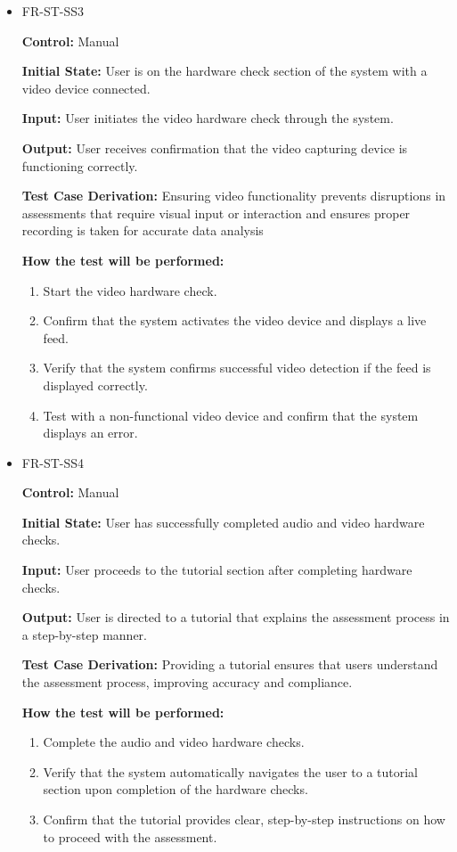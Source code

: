 \documentclass[12pt, titlepage]{article}
\begin{document}
\begin{itemize}
  \item FR-ST-SS3
    \begin{mdframed}[linewidth=0.5mm]
      \textbf{Control:} Manual \par
      \textbf{Initial State:} User is on the hardware check section of the system with a video device connected. \par
      \textbf{Input:} User initiates the video hardware check through the system. \par
      \textbf{Output:} User receives confirmation that the video capturing device is functioning correctly. \par
      \textbf{Test Case Derivation:} Ensuring video functionality prevents disruptions in assessments that require visual input or interaction and ensures 
      proper recording is taken for accurate data analysis \par
      \textbf{How the test will be performed:}
      \begin{enumerate}[noitemsep]
        \item Start the video hardware check.
        \item Confirm that the system activates the video device and displays a live feed.
        \item Verify that the system confirms successful video detection if the feed is displayed correctly.
        \item Test with a non-functional video device and confirm that the system displays an error.
      \end{enumerate}
    \end{mdframed}

  \item FR-ST-SS4
    \begin{mdframed}[linewidth=0.5mm]
      \textbf{Control:} Manual \par
      \textbf{Initial State:} User has successfully completed audio and video hardware checks. \par
      \textbf{Input:} User proceeds to the tutorial section after completing hardware checks. \par
      \textbf{Output:} User is directed to a tutorial that explains the assessment process in a step-by-step manner. \par
      \textbf{Test Case Derivation:} Providing a tutorial ensures that users understand the assessment process, improving accuracy and compliance. \par
      \textbf{How the test will be performed:}
      \begin{enumerate}[noitemsep]
        \item Complete the audio and video hardware checks.
        \item Verify that the system automatically navigates the user to a tutorial section upon completion of the hardware checks.
        \item Confirm that the tutorial provides clear, step-by-step instructions on how to proceed with the assessment.
      \end{enumerate}
    \end{mdframed}


\end{itemize}
\end{document}
